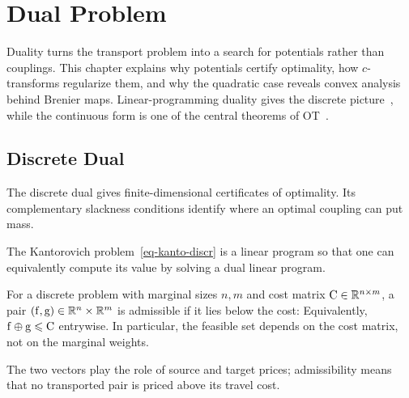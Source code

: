 
\chapter{Dual Problem}
\label{sec-dual}

Duality turns the transport problem into a search for potentials rather than couplings. This chapter explains why potentials certify optimality, how $c$-transforms regularize them, and why the quadratic case reveals convex analysis behind Brenier maps. Linear-programming duality gives the discrete picture~\cite{bertsimas1997introduction}, while the continuous form is one of the central theorems of OT~\cite{Villani03,SantambrogioBook}.

\section{Discrete Dual}
\label{sec-discrete-dual}


The discrete dual gives finite-dimensional certificates of optimality. Its complementary slackness conditions identify where an optimal coupling can put mass.

The Kantorovich problem~\eqref{eq-kanto-discr} is a linear program so that one can equivalently compute its value by solving a dual linear program.


\begin{defn}\label{def-admissible-potentials}
	For a discrete problem with marginal sizes $n,m$ and cost matrix $\mathrm{C}\in\mathbb{R}^{n\times m}$, a pair $(\mathrm{f},\mathrm{g})\in\mathbb{R}^n\times\mathbb{R}^m$ is admissible if it lies below the cost:
	Equivalently, $\mathrm{f}\oplus\mathrm{g}\leqslant\mathrm{C}$ entrywise. In particular, the feasible set depends on the cost matrix, not on the marginal weights.
\end{defn}
The two vectors play the role of source and target prices; admissibility means that no transported pair is priced above its travel cost.

